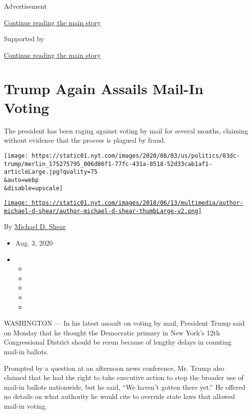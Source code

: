 Advertisement

\protect\hyperlink{after-top}{Continue reading the main story}

Supported by

\protect\hyperlink{after-sponsor}{Continue reading the main story}

\hypertarget{trump-again-assails-mail-in-voting}{%
\section{Trump Again Assails Mail-In
Voting}\label{trump-again-assails-mail-in-voting}}

The president has been raging against voting by mail for several months,
claiming without evidence that the process is plagued by fraud.

\texttt{[image: https://static01.nyt.com/images/2020/08/03/us/politics/03dc-trump/merlin\_175275795\_006d86f1-77fc-431a-8518-52d33cab1af1-articleLarge.jpg?quality=75\\\&auto=webp\\\&disable=upscale]}

\href{https://www.nytimes.com/by/michael-d-shear}{\texttt{[image: https://static01.nyt.com/images/2018/06/13/multimedia/author-michael-d-shear/author-michael-d-shear-thumbLarge-v2.png]}}

By \href{https://www.nytimes.com/by/michael-d-shear}{Michael D. Shear}

\begin{itemize}
\item
  Aug. 3, 2020
\item
  \begin{itemize}
  \item
  \item
  \item
  \item
  \item
  \end{itemize}
\end{itemize}

WASHINGTON --- In his latest assault on voting by mail, President Trump
said on Monday that he thought the Democratic primary in New York's 12th
Congressional District should be rerun because of lengthy delays in
counting mail-in ballots.

Prompted by a question at an afternoon news conference, Mr. Trump also
claimed that he had the right to take executive action to stop the
broader use of mail-in ballots nationwide, but he said, ``We haven't
gotten there yet.'' He offered no details on what authority he would
cite to override state laws that allowed mail-in voting.

